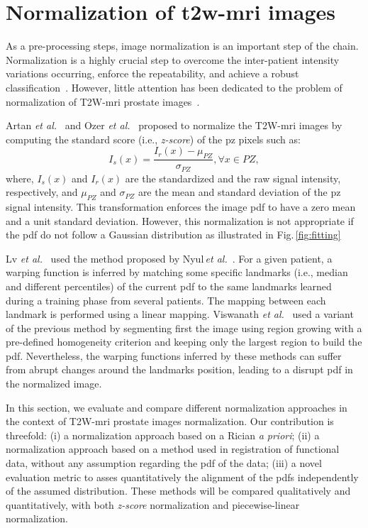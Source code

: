 \section{Normalization of \ac{t2w}-\ac{mri} images} \label{sec:chp5:T2-norm}

As a pre-processing steps, image normalization is an important step of the chain.
Normalization is a highly crucial step to overcome the inter-patient intensity variations occurring, enforce the repeatability, and achieve a robust classification~\cite{Lemaitre2015}.
However, little attention has been dedicated to the problem of normalization of T2W-\ac{mri} prostate images~\cite{Lemaitre2015}.

Artan \textit{et al.}~\cite{Artan2010,Artan2009} and Ozer \textit{et al.}~\cite{Ozer2009,Ozer2010} proposed to normalize the T2W-\ac{mri} images by computing the standard score (i.e., \textit{z-score}) of the \ac{pz} pixels such as: 
\begin{equation}
  I_{s}(x) = \frac{I_{r}(x) - \mu_{PZ}}{\sigma_{PZ}}, \forall x\in PZ ,
  \label{eq:zscore}
\end{equation}
\noindent where, $I_{s}(x)$ and $I_{r}(x)$ are the standardized and the raw signal intensity, respectively, and $\mu_{PZ}$ and $\sigma_{PZ}$ are the mean and standard deviation of the \ac{pz} signal intensity. 
This transformation enforces the image \ac{pdf} to have a zero mean and a unit standard deviation.
However, this normalization is not appropriate if the \ac{pdf} do not follow a Gaussian distribution as illustrated in Fig.\,\ref{fig:fitting}

Lv \textit{et al.}~\cite{Lv2009} used the method proposed by Nyul\,\textit{et al.}~\cite{Nyul2000}.
For a given patient, a warping function is inferred by matching some specific landmarks (i.e., median and different percentiles) of the current \ac{pdf} to the same landmarks learned during a training phase from several patients. 
The mapping between each landmark is performed using a linear mapping.
Viswanath \textit{et al.}~\cite{Viswanath2012} used a variant of the previous method by segmenting first the image using region growing with a pre-defined homogeneity criterion and keeping only the largest region to build the \ac{pdf}.
Nevertheless, the warping functions inferred by these methods can suffer from abrupt changes around the landmarks position, leading to a disrupt \ac{pdf} in the normalized image.  

In this section, we evaluate and compare different normalization approaches in the context of T2W-\ac{mri} prostate images normalization.
Our contribution is threefold: (i) a normalization approach based on a Rician \textit{a priori}; (ii) a normalization approach based on a method used in registration of functional data, without any assumption regarding the \ac{pdf} of the data; (iii) a novel evaluation metric to asses quantitatively the alignment of the \acp{pdf} independently of the assumed distribution. 
These methods will be compared qualitatively and quantitatively, with both \textit{z-score} normalization and piecewise-linear normalization.


